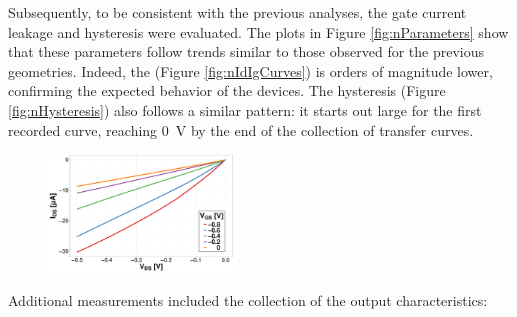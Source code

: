 Subsequently, to be consistent with the previous analyses, the gate current leakage and hysteresis were evaluated. The plots in Figure \ref{fig:nParameters} show that these parameters follow trends similar to those observed for the previous geometries. Indeed, the \igs{} (Figure \ref{fig:nIdIgCurves}) is orders of magnitude lower, confirming the expected behavior of the devices. The hysteresis (Figure \ref{fig:nHysteresis}) also follows a similar pattern: it starts out large for the first recorded curve, reaching \SI{0}{\V} by the end of the collection of transfer curves.

\begin{figure}
    \centering
    \includegraphics[width = 0.45\textwidth]{figures/chapter3/nEGFET/nOutput.pdf}
    \caption{ }
    \label{fig:nOutput}
\end{figure}

Additional measurements included the collection of the output characteristics:


